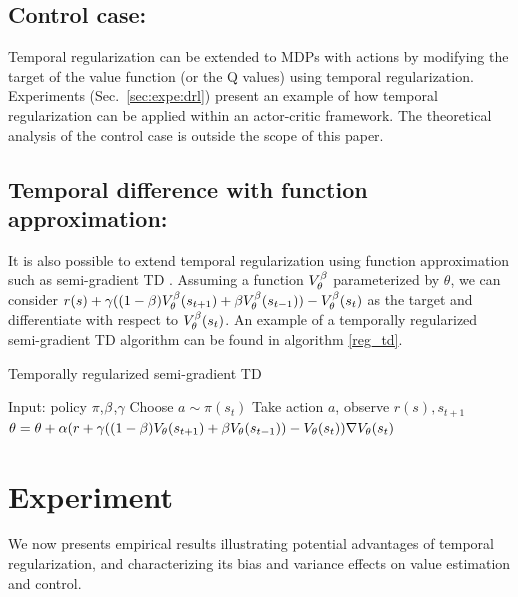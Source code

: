 \subsection{Control case:} 
Temporal regularization can be extended to MDPs with actions by  modifying the target of the value function (or the Q values) using temporal regularization. Experiments (Sec.~\ref{sec:expe:drl}) present an example of how temporal regularization can be applied within an actor-critic framework. The theoretical analysis of the control case is outside the scope of this paper.

\subsection{Temporal difference with function approximation:}
It is also possible to extend temporal regularization using function approximation such as  semi-gradient TD \citep{sutton2017reinforcement}. 
Assuming a function $V_{\theta}^{\beta}$ parameterized by $\theta$, we can consider $r(s) + \gamma ((1-\beta)V_{\theta}^{\beta}(s_{t+1}) + \beta V_{\theta}^{\beta}(s_{t-1})) - V_{\theta}^{\beta}(s_t)$  as the target and differentiate with respect to $V_{\theta}^{\beta}(s_{t})$. An example of a temporally regularized semi-gradient TD algorithm can be found in algorithm \ref{reg_td}.

\begin{algorithm}[H]
\caption{Temporally regularized semi-gradient TD}
\begin{algorithmic}[1]
	\label{reg_td}
    \STATE Input: policy $\pi$,$\beta$,$\gamma$
        \STATE Choose $a \sim \pi(s_t)$
        \STATE Take action $a$, observe $r(s),s_{t+1}$
        \STATE $\theta = \theta + \alpha (r + \gamma((1-\beta) V_{\theta}(s_{t+1}) + \beta V_{\theta}(s_{t-1})) - V_{\theta}(s_t))\nabla V_{\theta}(s_{t}) $
    \ENDFOR
\end{algorithmic}
\end{algorithm}


\section{Experiment}
We now presents empirical results illustrating potential advantages of temporal regularization, and characterizing its bias and variance effects on value estimation and control.



